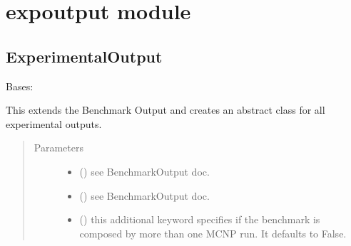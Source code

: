 \documentclass[letterpaper,10pt,english]{sphinxmanual}
\begin{document}
\section{expoutput module}
\label{\detokenize{api/postprocessing:expoutput-module}}

\subsection{ExperimentalOutput}
\label{\detokenize{api/postprocessing:experimentaloutput}}\label{\detokenize{api/postprocessing:expoutputclass}}

\begin{fulllineitems}
\label{\detokenize{api/postprocessing:expoutput.ExperimentalOutput}}
\sphinxAtStartPar
Bases: {\hyperref[\detokenize{api/postprocessing:output.BenchmarkOutput}]{}}

\sphinxAtStartPar
This extends the Benchmark Output and creates an abstract class
for all experimental outputs.
\begin{quote}\begin{description}
\item[{Parameters}] \leavevmode\begin{itemize}
\item {} 
\sphinxAtStartPar
{} () \textendash{} see BenchmarkOutput doc.

\item {} 
\sphinxAtStartPar
{} () \textendash{} see BenchmarkOutput doc.

\item {} 
\sphinxAtStartPar
{} () \textendash{} this additional keyword specifies if the benchmark is composed
by more than one MCNP run. It defaults to False.

\end{itemize}


\end{description}
\end{quote}
\end{fulllineitems}
\end{document}

